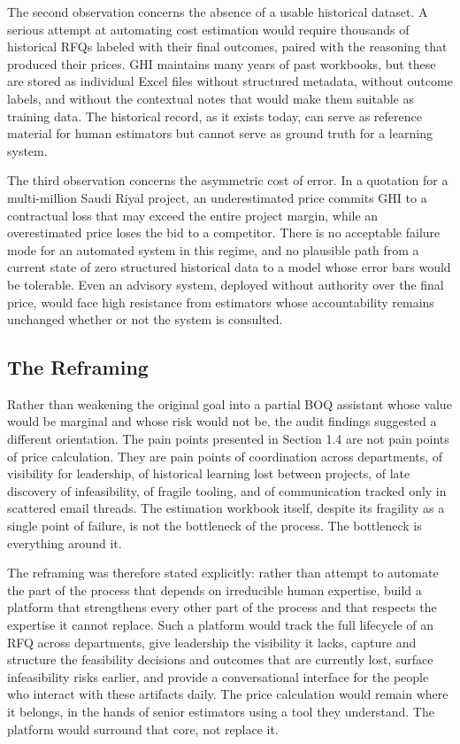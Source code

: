 The second observation concerns the absence of a usable historical dataset. A serious attempt at automating cost estimation would require thousands of historical RFQs labeled with their final outcomes, paired with the reasoning that produced their prices. GHI maintains many years of past workbooks, but these are stored as individual Excel files without structured metadata, without outcome labels, and without the contextual notes that would make them suitable as training data. The historical record, as it exists today, can serve as reference material for human estimators but cannot serve as ground truth for a learning system.

The third observation concerns the asymmetric cost of error. In a quotation for a multi-million Saudi Riyal project, an underestimated price commits GHI to a contractual loss that may exceed the entire project margin, while an overestimated price loses the bid to a competitor. There is no acceptable failure mode for an automated system in this regime, and no plausible path from a current state of zero structured historical data to a model whose error bars would be tolerable. Even an advisory system, deployed without authority over the final price, would face high resistance from estimators whose accountability remains unchanged whether or not the system is consulted.

\subsection*{The Reframing}
Rather than weakening the original goal into a partial BOQ assistant whose value would be marginal and whose risk would not be, the audit findings suggested a different orientation. The pain points presented in Section 1.4 are not pain points of price calculation. They are pain points of coordination across departments, of visibility for leadership, of historical learning lost between projects, of late discovery of infeasibility, of fragile tooling, and of communication tracked only in scattered email threads. The estimation workbook itself, despite its fragility as a single point of failure, is not the bottleneck of the process. The bottleneck is everything around it.

The reframing was therefore stated explicitly: rather than attempt to automate the part of the process that depends on irreducible human expertise, build a platform that strengthens every other part of the process and that respects the expertise it cannot replace. Such a platform would track the full lifecycle of an RFQ across departments, give leadership the visibility it lacks, capture and structure the feasibility decisions and outcomes that are currently lost, surface infeasibility risks earlier, and provide a conversational interface for the people who interact with these artifacts daily. The price calculation would remain where it belongs, in the hands of senior estimators using a tool they understand. The platform would surround that core, not replace it.

